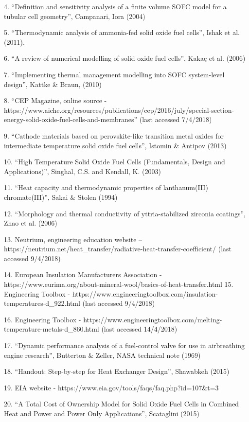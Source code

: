 4. “Definition and sensitivity analysis of a finite volume SOFC model for a tubular cell geometry”, Campanari, Iora (2004)

5. “Thermodynamic analysis of ammonia-fed solid oxide fuel cells”, Ishak et al. (2011).

6. “A review of numerical modelling of solid oxide fuel cells”, Kakaç et al. (2006)

7. “Implementing thermal management modelling into SOFC system-level design”, Kattke & Braun, (2010)

8. “CEP Magazine, online source - https://www.aiche.org/resources/publications/cep/2016/july/special-section-energy-solid-oxide-fuel-cells-and-membranes” (last accessed 7/4/2018)

9. “Cathode materials based on perovskite-like transition metal oxides for intermediate temperature solid oxide fuel cells”, Istomin & Antipov (2013)

10. “High Temperature Solid Oxide Fuel Cells (Fundamentals, Design and Applications)”, Singhal, C.S. and Kendall, K. (2003)

11. “Heat capacity and thermodynamic properties of lanthanum(III) chromate(III)”, Sakai & Stolen (1994)

12. “Morphology and thermal conductivity of yttria-stabilized zirconia coatings”, Zhao et al. (2006)

13. Neutrium, engineering education website – https://neutrium.net/heat_transfer/radiative-heat-transfer-coefficient/ (last accessed 9/4/2018)

14. European Insulation Manufacturers Association - https://www.eurima.org/about-mineral-wool/basics-of-heat-transfer.html
15. Engineering Toolbox - https://www.engineeringtoolbox.com/insulation-temperatures-d_922.html (last accessed 9/4/2018)

16. Engineering Toolbox - https://www.engineeringtoolbox.com/melting-temperature-metals-d_860.html (last accessed 14/4/2018)

17. “Dynamic performance analysis of a fuel-control valve for use in airbreathing engine research”, Butterton & Zeller, NASA technical note (1969)

18. “Handout: Step-by-step for Heat Exchanger Design”, Shawabkeh (2015)

19. EIA website - https://www.eia.gov/tools/faqs/faq.php?id=107&t=3

20. “A Total Cost of Ownership Model for Solid Oxide Fuel Cells in Combined Heat and Power and Power Only Applications”, Scataglini (2015)

